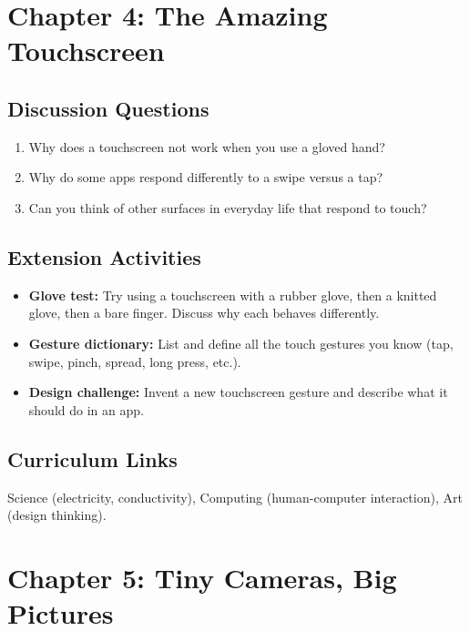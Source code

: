 \sectionrule

\section*{Chapter 4: The Amazing Touchscreen}

\subsection*{Discussion Questions}
\begin{enumerate}
  \item Why does a touchscreen not work when you use a gloved hand?
  \item Why do some apps respond differently to a swipe versus a tap?
  \item Can you think of other surfaces in everyday life that respond to touch?
\end{enumerate}

\subsection*{Extension Activities}
\begin{itemize}
  \item \textbf{Glove test:} Try using a touchscreen with a rubber glove, then a knitted glove, then a bare finger. Discuss why each behaves differently.
  \item \textbf{Gesture dictionary:} List and define all the touch gestures you know (tap, swipe, pinch, spread, long press, etc.).
  \item \textbf{Design challenge:} Invent a new touchscreen gesture and describe what it should do in an app.
\end{itemize}

\subsection*{Curriculum Links}
Science (electricity, conductivity), Computing (human-computer interaction), Art (design thinking).

\sectionrule

\section*{Chapter 5: Tiny Cameras, Big Pictures}

